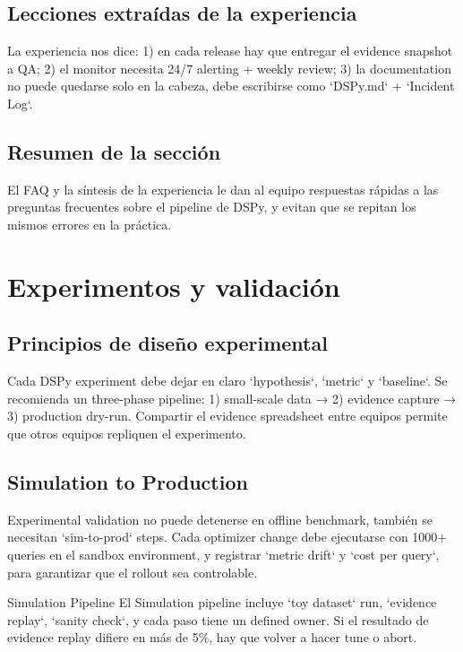 \documentclass[a4paper]{article}
\begin{document}
\subsection{Lecciones extraídas de la experiencia}

La experiencia nos dice: 1) en cada release hay que entregar el evidence snapshot a QA; 2) el monitor necesita 24/7 alerting + weekly review; 3) la documentation no puede quedarse solo en la cabeza, debe escribirse como `DSPy.md` + `Incident Log`.

\subsection{Resumen de la sección}

El FAQ y la síntesis de la experiencia le dan al equipo respuestas rápidas a las preguntas frecuentes sobre el pipeline de DSPy, y evitan que se repitan los mismos errores en la práctica.

\section{Experimentos y validación}

\subsection{Principios de diseño experimental}

Cada DSPy experiment debe dejar en claro `hypothesis`, `metric` y `baseline`. Se recomienda un three-phase pipeline: 1) small-scale data → 2) evidence capture → 3) production dry-run. Compartir el evidence spreadsheet entre equipos permite que otros equipos repliquen el experimento.

\subsection{Simulation to Production}

Experimental validation no puede detenerse en offline benchmark, también se necesitan `sim-to-prod` steps. Cada optimizer change debe ejecutarse con 1000+ queries en el sandbox environment, y registrar `metric drift` y `cost per query`, para garantizar que el rollout sea controlable.

\begin{knowledgebox}{Simulation Pipeline}
El Simulation pipeline incluye `toy dataset` run, `evidence replay`, `sanity check`, y cada paso tiene un defined owner. Si el resultado de evidence replay difiere en más de 5\%, hay que volver a hacer tune o abort.
\end{knowledgebox}
\end{document}
